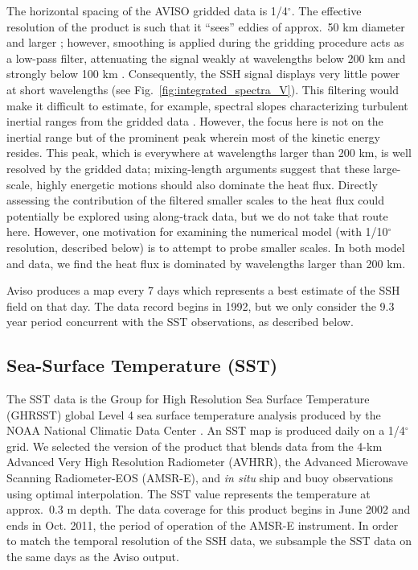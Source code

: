 \documentclass[10pt]{article}
\begin{document}
The horizontal spacing of the AVISO gridded data is 1/4$^\circ$. The effective resolution of the product is such that it ``sees'' eddies of approx.~50 km diameter and larger \citep{CheltonEtAl2011}; however, smoothing is applied during the gridding procedure acts as a low-pass filter, attenuating the signal weakly at wavelengths below 200 km and strongly below 100 km \citep{DucetEtAl2000}. Consequently, the SSH signal displays very little power at short wavelengths (see Fig.~\ref{fig:integrated_spectra_V}). This filtering would make it difficult to estimate, for example, spectral slopes characterizing turbulent inertial ranges from the gridded data \citep{XuFu2011}. However, the focus here is not on the inertial range but of the prominent peak wherein most of the kinetic energy resides. This peak, which is everywhere at wavelengths larger than 200 km, is well resolved by the gridded data; mixing-length arguments suggest that these large-scale, highly energetic motions should also dominate the heat flux. Directly assessing the contribution of the filtered smaller scales to the heat flux could potentially be explored using along-track data, but we do not take that route here. However, one motivation for examining the numerical model (with 1/10$^\circ$ resolution, described below) is to attempt to probe smaller scales. In both model and data, we find the heat flux is dominated by wavelengths larger than 200 km.

Aviso produces a map every 7 days which represents a best estimate of the SSH field on that day. The data record begins in 1992, but we only consider the 9.3 year period concurrent with the SST observations, as described below.

\subsection{Sea-Surface Temperature (SST)}

The SST data is the Group for High Resolution Sea Surface Temperature (GHRSST) global Level 4 sea surface temperature analysis produced by the NOAA National Climatic Data Center \citep{ReynoldsEtAl2007}. An SST map is produced daily on a 1/4$^\circ$ grid. We selected the version of the product that blends data from the 4-km Advanced Very High Resolution Radiometer (AVHRR), the Advanced Microwave Scanning Radiometer-EOS (AMSR-E), and {\em in situ} ship and buoy observations using optimal interpolation. The SST value represents the temperature at approx.~0.3 m depth. The data coverage for this product begins in June 2002 and ends in Oct. 2011, the period of operation of the AMSR-E instrument. In order to match the temporal resolution of the SSH data, we subsample the SST data on the same days as the Aviso output.
\end{document}
